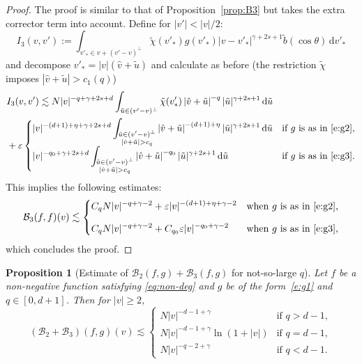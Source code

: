 \documentclass[JEP,XML,SOM,Unicode,NoFloatCountersInSection]{cedram}
\theoremstyle{plain}
\newtheorem{prop}[thm]{Proposition}
\theoremstyle{definition}
\numberwithin{equation}{section}
\newcommand{\eps}{\varepsilon}
\newcommand{\dd} {\, \mathrm{d}}
\let\A N
\begin{document}
\begin{proof}
The proof is similar to that of Proposition~\ref{prop:B3} but takes
the extra corrector term into account. Define for $|v'| < |v|/2$:
\begin{equation*}
I_3(v,v') := \int_{v'_* \in v + (v'-v)^\bot} \tilde \chi(v'_*) g(v'_*)
|v-v'_*|^{\gamma+2s+1} \tilde b(\cos \theta) \dd v'_*
\end{equation*}
and decompose $v'_* = |v| (\hat v + \tilde u)$ and calculate as before
(the restriction $\tilde \chi$ imposes $|\hat v + \tilde u| > c_1(q)$)
\begin{align*}
& I_3(v,v')
\lesssim \A |v|^{-q+ \gamma +2s+d} \int_{\tilde u \in (v'-v)^\bot}
\tilde \chi(v'_*) \left|\hat v + \tilde u \right|^{-q}
|\tilde u|^{\gamma+2s +1} \dd \tilde u \\
& + \eps \begin{cases} \displaystyle
|v|^{-(d+1)+\eta + \gamma +2s+d} \int_{\substack{\tilde u \in
(v'-v)^\bot\\\left|\hat v + \tilde u \right| > c_q}}
\left|\hat v + \tilde u \right|^{-(d+1)+\eta} |\tilde u|^{\gamma+2s
+1} \dd \tilde u & \text{if $g$ is as in \eqref{e:g2},} \\[3mm] \displaystyle
|v|^{-q_0 + \gamma +2s+d} \int_{\substack{\tilde u \in
(v'-v)^\bot\\\left|\hat v + \tilde u \right| > c_q}}
\left|\hat v + \tilde u \right|^{-q_0} |\tilde u|^{\gamma+2s +1} \dd
\tilde u & \text{if $g$ is as in \eqref{e:g3}.}
\end{cases}
\end{align*}
This implies the following estimates:
\begin{align*}
\mathcal{B}_3 (f,f)(v) \lesssim \begin{cases}\displaystyle
C_q \A |v|^{-q+\gamma-2} + \eps |v|^{-(d+1)+\eta + \gamma -2}
& \text{when $g$ is as in \eqref{e:g2},}\\[3mm] \displaystyle
C_q \A |v|^{-q+\gamma-2} + C_{q_0} \eps |v|^{-q_0 + \gamma -2} & \text{when $g$ is as in \eqref{e:g3},}
\end{cases}
\end{align*}
which concludes the proof.
\end{proof}

\begin{prop}[Estimate of {$\mathcal{B}_2(f,g) + \mathcal{B}_3(f,g)$} for
not-so-large $q$]\label{prop:B23-2}
Let $f$ be a non-negative function satisfying \eqref{eq:non-deg} and
$g$ be of the form~\eqref{e:g1} and $q \in [0,d+1]$. Then for $|v| \ge 2$,
\[ (\mathcal{B}_2 + \mathcal{B}_3)(f,g)(v) \lesssim \begin{cases}
\A |v|^{-d-1+\gamma} & \text{if } q > d-1,\\
\A |v|^{-d-1+\gamma} \ln (1+|v|) & \text{if } q = d-1,\\
\A |v|^{-q-2+\gamma} & \text{if } q < d-1.
\end{cases}
\]
\end{prop}
\end{document}
